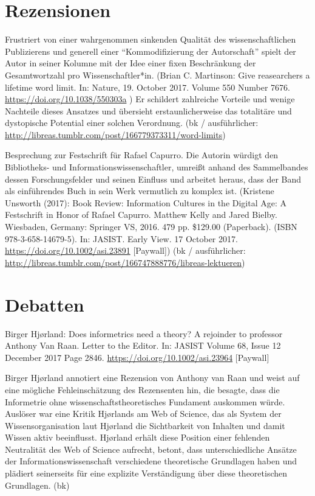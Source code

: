 \documentclass[a4paper,
fontsize=11pt,
oneside,
numbers=noperiodatend,
parskip=half-,
bibliography=totoc,
final
]{scrartcl}
\begin{document}
\hypertarget{rezensionen}{%
\section*{Rezensionen}\label{rezensionen}}

Frustriert von einer wahrgenommen sinkenden Qualität des
wissenschaftlichen Publizierens und generell einer
\enquote{Kommodifizierung der Autorschaft} spielt der Autor in seiner
Kolumne mit der Idee einer fixen Beschränkung der Gesamtwortzahl pro
Wissenschaftler*in. (Brian C. Martinson: Give reasearchers a lifetime
word limit. In: Nature, 19. October 2017. Volume 550 Number 7676.
\url{https://doi.org/10.1038/550303a} ) Er schildert zahlreiche Vorteile
und wenige Nachteile dieses Ansatzes und übersieht erstaunlicherweise
das totalitäre und dystopische Potential einer solchen Verordnung. (bk /
ausführlicher:
\url{http://libreas.tumblr.com/post/166779373311/word-limits})

Besprechung zur Festschrift für Rafael Capurro. Die Autorin würdigt den
Bibliotheks- und Informationswissenschaftler, umreißt anhand des
Sammelbandes dessen Forschungsfelder und seinen Einfluss und arbeitet
heraus, dass der Band als einführendes Buch in sein Werk vermutlich zu
komplex ist. (Kristene Unsworth (2017): Book Review: Information
Cultures in the Digital Age: A Festschrift in Honor of Rafael Capurro.
Matthew Kelly and Jared Bielby. Wiesbaden, Germany: Springer VS, 2016.
479 pp. \$129.00 (Paperback). (ISBN 978-3-658-14679-5). In: JASIST.
Early View. 17 October 2017. \url{https://doi.org/10.1002/asi.23891}
{[}Paywall{]}) (bk / ausführlicher:
\url{http://libreas.tumblr.com/post/166747888776/libreas-lektueren})

\hypertarget{debatten}{%
\section*{Debatten}\label{debatten}}

Birger Hjørland: Does informetrics need a theory? A rejoinder to
professor Anthony Van Raan. Letter to the Editor. In: JASIST Volume 68,
Issue 12 December 2017 Page 2846.
\url{https://doi.org/10.1002/asi.23964} {[}Paywall{]}

Birger Hjørland annotiert eine Rezension von Anthony van Raan und weist
auf eine mögliche Fehleinschätzung des Rezensenten hin, die besagte,
dass die Informetrie ohne wissenschaftstheoretisches Fundament auskommen
würde. Auslöser war eine Kritik Hjørlands am Web of Science, das als
System der Wissensorganisation laut Hjørland die Sichtbarkeit von
Inhalten und damit Wissen aktiv beeinflusst. Hjørland erhält diese
Position einer fehlenden Neutralität des Web of Science aufrecht,
betont, dass unterschiedliche Ansätze der Informationswissenschaft
verschiedene theoretische Grundlagen haben und plädiert seinerseits für
eine explizite Verständigung über diese theoretischen Grundlagen. (bk)
\end{document}
